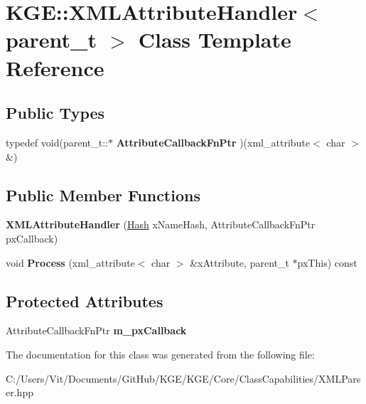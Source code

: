\hypertarget{class_k_g_e_1_1_x_m_l_attribute_handler}{\section{K\-G\-E\-:\-:X\-M\-L\-Attribute\-Handler$<$ parent\-\_\-t $>$ Class Template Reference}
\label{class_k_g_e_1_1_x_m_l_attribute_handler}
}
\subsection*{Public Types}
\begin{DoxyCompactItemize}
\item 
\hypertarget{class_k_g_e_1_1_x_m_l_attribute_handler_aac0ba9461ecd0f95b64b3de8987a17d1}{typedef void(parent\-\_\-t\-::$\ast$ {\bfseries Attribute\-Callback\-Fn\-Ptr} )(xml\-\_\-attribute$<$ char $>$ \&)}\label{class_k_g_e_1_1_x_m_l_attribute_handler_aac0ba9461ecd0f95b64b3de8987a17d1}

\end{DoxyCompactItemize}
\subsection*{Public Member Functions}
\begin{DoxyCompactItemize}
\item 
\hypertarget{class_k_g_e_1_1_x_m_l_attribute_handler_ab0d6fefb953c5b400f551f3c968b474b}{{\bfseries X\-M\-L\-Attribute\-Handler} (\hyperlink{class_k_g_e_1_1_hash}{Hash} x\-Name\-Hash, Attribute\-Callback\-Fn\-Ptr px\-Callback)}\label{class_k_g_e_1_1_x_m_l_attribute_handler_ab0d6fefb953c5b400f551f3c968b474b}

\item 
\hypertarget{class_k_g_e_1_1_x_m_l_attribute_handler_a73b9328398e4682e6bd927673ab94b6f}{void {\bfseries Process} (xml\-\_\-attribute$<$ char $>$ \&x\-Attribute, parent\-\_\-t $\ast$px\-This) const }\label{class_k_g_e_1_1_x_m_l_attribute_handler_a73b9328398e4682e6bd927673ab94b6f}

\end{DoxyCompactItemize}
\subsection*{Protected Attributes}
\begin{DoxyCompactItemize}
\item 
\hypertarget{class_k_g_e_1_1_x_m_l_attribute_handler_a3a2e1be1a6a09096dfac40410c05c802}{Attribute\-Callback\-Fn\-Ptr {\bfseries m\-\_\-px\-Callback}}\label{class_k_g_e_1_1_x_m_l_attribute_handler_a3a2e1be1a6a09096dfac40410c05c802}

\end{DoxyCompactItemize}


The documentation for this class was generated from the following file\-:\begin{DoxyCompactItemize}
\item 
C\-:/\-Users/\-Vit/\-Documents/\-Git\-Hub/\-K\-G\-E/\-K\-G\-E/\-Core/\-Class\-Capabilities/X\-M\-L\-Parser.\-hpp\end{DoxyCompactItemize}
